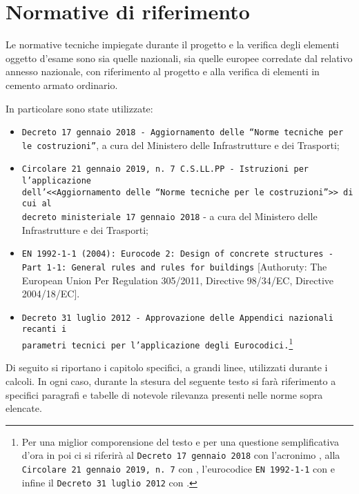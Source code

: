 
\chapter{Normative di riferimento}\label{chap:norme}
Le normative tecniche impiegate durante il progetto e la verifica degli elementi oggetto d'esame sono sia quelle nazionali, sia quelle europee corredate dal relativo annesso nazionale, con riferimento al progetto e alla verifica di elementi in cemento armato ordinario.

In particolare sono state utilizzate:
\begin{itemize}
	\item \texttt{Decreto 17 gennaio 2018 - Aggiornamento delle ``Norme tecniche per le\\ costruzioni''}, a cura del Ministero delle Infrastrutture e dei Trasporti;
	\item \texttt{Circolare 21 gennaio 2019, n. 7 C.S.LL.PP - Istruzioni per l'applicazione\\ dell'<<Aggiornamento delle ``Norme tecniche per le costruzioni''>> di cui al\\decreto ministeriale 17 gennaio 2018} - a cura del Ministero delle Infrastrutture e dei Trasporti;
	\item \texttt{EN 1992-1-1 (2004): Eurocode 2: Design of concrete structures - Part 1-1: General rules and rules for buildings} [Authoruty: The European Union Per Regulation 305/2011, Directive 98/34/EC, Directive 2004/18/EC].
	\item \texttt{Decreto 31 luglio 2012 - Approvazione delle Appendici nazionali recanti i\\parametri tecnici per l’applicazione degli Eurocodici.}\noindent\footnote{Per una miglior comporensione del testo e per una questione semplificativa d'ora in poi ci si riferir\`a al \texttt{Decreto 17 gennaio 2018} con l'acronimo \ntc, alla \texttt{Circolare 21 gennaio 2019, n. 7} con \circolare, l'eurocodice \texttt{EN 1992-1-1} con \ec e infine il \texttt{Decreto 31 luglio 2012} con \nad.}
\end{itemize}

Di seguito si riportano i capitolo specifici, a grandi linee, utilizzati durante i calcoli. In ogni caso, durante la stesura del seguente testo si farà riferimento a specifici paragrafi e tabelle di notevole rilevanza presenti nelle norme sopra elencate.

